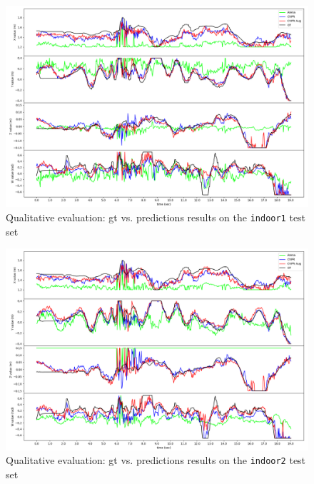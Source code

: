 \begin{figure}[!h]
	\centering
	\includegraphics[width=1 \textwidth]{"contents/images/06-gtpred-indoor1"}
	\caption[Qualitative evaluation: \gls{gt} vs. predictions results on the \texttt{indoor1} test set]{Qualitative evaluation: \gls{gt} vs. predictions results on the \texttt{indoor1} test set}
	\label{fig:ql-gtpred-indoor1}
\end{figure}

\begin{figure}[H]
	\centering
	\includegraphics[width=1 \textwidth]{"contents/images/06-gtpred-indoor2"}
	\caption[Qualitative evaluation: \gls{gt} vs. predictions results on the \texttt{indoor2} test set]{Qualitative evaluation: \gls{gt} vs. predictions results on the \texttt{indoor2} test set}
	\label{fig:ql-gtpred-indoor2}
\end{figure}


